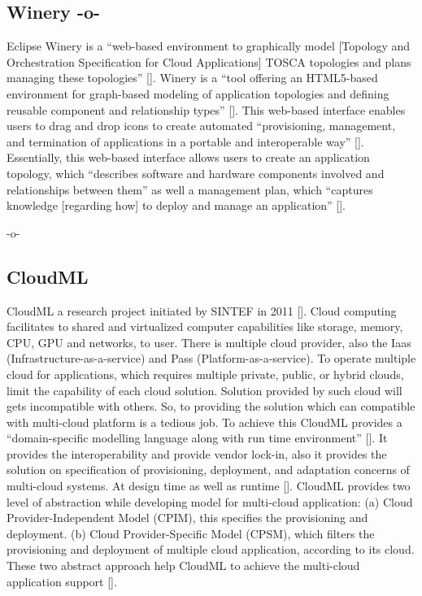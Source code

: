 \subsection{Winery -o-}

Eclipse Winery is a ``web-based environment to graphically model
[Topology and Orchestration Specification for Cloud Applications]
TOSCA topologies and plans managing these
topologies'' [\cite{www-winery}]. Winery is a ``tool offering an
HTML5-based environment for graph-based modeling of application
topologies and defining reusable component and relationship
types'' [\cite{winery-paper-2013}]. This web-based interface enables
users to drag and drop icons to create automated ``provisioning,
management, and termination of applications in a portable and
interoperable way'' [\cite{winery-paper-2013}].  Essentially, this
web-based interface allows users to create an application topology,
which ``describes software and hardware components involved and
relationships between them'' as well a management plan, which
``captures knowledge [regarding how] to deploy and manage an
application'' [\cite{winery-paper-2013}].

     -o-
     

\subsection{CloudML}
                                                            
CloudML a research project initiated by SINTEF in 2011
 [\cite{www-cloudml}]. Cloud computing facilitates to shared and
virtualized computer capabilities like storage, memory, CPU, GPU and
networks, to user. There is multiple cloud provider, also the Iaas
(Infrastructure-as-a-service) and Pass (Platform-as-a-service). To
operate multiple cloud for applications, which requires multiple
private, public, or hybrid clouds, limit the capability of each cloud
solution.  Solution provided by such cloud will gets incompatible with
others. So, to providing the solution which can compatible with
multi-cloud platform is a tedious job. To achieve this CloudML
provides a ``domain-specific modelling language along with run time
environment'' [\cite{www-cloudml}]. It provides the interoperability and
provide vendor lock-in, also it provides the solution on specification
of provisioning, deployment, and adaptation concerns of multi-cloud
systems. At design time as well as runtime [\cite{www-cloudml}].
CloudML provides two level of abstraction while developing model for
multi-cloud application: (a) Cloud Provider-Independent Model (CPIM),
this specifies the provisioning and deployment.  (b) Cloud
Provider-Specific Model (CPSM), which filters the provisioning and
deployment of multiple cloud application, according to its cloud.
These two abstract approach help CloudML to achieve the multi-cloud
application support [\cite{www-cloudmlwiki}].

